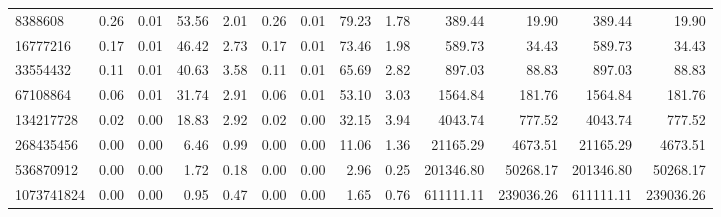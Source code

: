 \begin{tabular}{lrrrrrrrrrrrr}
8388608 & 0.26 & 0.01 & 53.56 & 2.01 & 0.26 & 0.01 & 79.23 & 1.78 & 389.44 & 19.90 & 389.44 & 19.90 \\
16777216 & 0.17 & 0.01 & 46.42 & 2.73 & 0.17 & 0.01 & 73.46 & 1.98 & 589.73 & 34.43 & 589.73 & 34.43 \\
33554432 & 0.11 & 0.01 & 40.63 & 3.58 & 0.11 & 0.01 & 65.69 & 2.82 & 897.03 & 88.83 & 897.03 & 88.83 \\
67108864 & 0.06 & 0.01 & 31.74 & 2.91 & 0.06 & 0.01 & 53.10 & 3.03 & 1564.84 & 181.76 & 1564.84 & 181.76 \\
134217728 & 0.02 & 0.00 & 18.83 & 2.92 & 0.02 & 0.00 & 32.15 & 3.94 & 4043.74 & 777.52 & 4043.74 & 777.52 \\
268435456 & 0.00 & 0.00 & 6.46 & 0.99 & 0.00 & 0.00 & 11.06 & 1.36 & 21165.29 & 4673.51 & 21165.29 & 4673.51 \\
536870912 & 0.00 & 0.00 & 1.72 & 0.18 & 0.00 & 0.00 & 2.96 & 0.25 & 201346.80 & 50268.17 & 201346.80 & 50268.17 \\
1073741824 & 0.00 & 0.00 & 0.95 & 0.47 & 0.00 & 0.00 & 1.65 & 0.76 & 611111.11 & 239036.26 & 611111.11 & 239036.26 \\
\bottomrule
\end{tabular}
